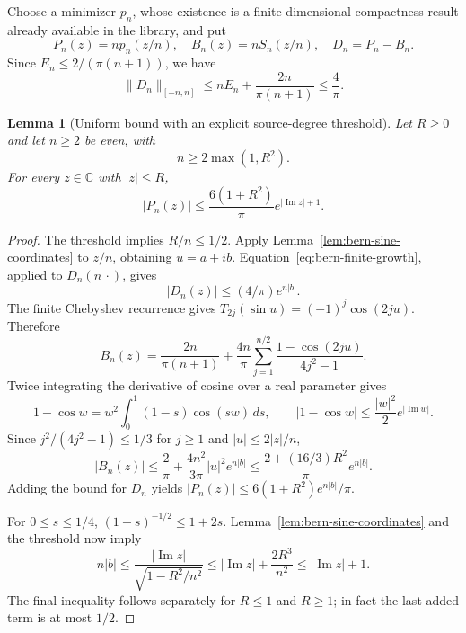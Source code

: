 \documentclass[11pt,a4paper]{article}
\newtheorem{lemma}[theorem]{Lemma}
\theoremstyle{definition}
\newcommand{\C}{\mathbb C}
\begin{document}
Choose a minimizer $p_n$, whose existence is a finite-dimensional
compactness result already available in the library, and put
\[
 P_n(z)=np_n(z/n),\quad B_n(z)=nS_n(z/n),\quad D_n=P_n-B_n.
\]
Since $E_n\le2/(\pi(n+1))$, we have
\begin{equation}
 \|D_n\|_{[-n,n]}\le nE_n+\frac{2n}{\pi(n+1)}
 \le\frac4\pi.
 \label{eq:bern-bounded-difference}
\end{equation}

\begin{lemma}[Uniform bound with an explicit source-degree threshold]
\label{lem:bern-uniform-finite}
Let $R\ge0$ and let $n\ge2$ be even, with
\[
 n\ge2\max(1,R^2).
\]
For every $z\in\C$ with $|z|\le R$,
\begin{equation}
 |P_n(z)|\le\frac{6(1+R^2)}\pi
                   e^{|\operatorname{Im}z|+1}.
 \label{eq:bern-uniform-finite}
\end{equation}
\end{lemma}
\begin{proof}
The threshold implies $R/n\le1/2$. Apply
Lemma~\ref{lem:bern-sine-coordinates} to $z/n$, obtaining $u=a+ib$.
Equation~\eqref{eq:bern-finite-growth}, applied to
$D_n(n\,\cdot)$, gives
\[
 |D_n(z)|\le(4/\pi)e^{n|b|}.
\]
The finite Chebyshev recurrence gives
$T_{2j}(\sin u)=(-1)^j\cos(2ju)$. Therefore
\[
 B_n(z)=\frac{2n}{\pi(n+1)}+
       \frac{4n}{\pi}\sum_{j=1}^{n/2}
       \frac{1-\cos(2ju)}{4j^2-1}.
\]
Twice integrating the derivative of cosine over a real parameter gives
\[
 1-\cos w=w^2\int_0^1(1-s)\cos(sw)\,ds,
 \qquad |1-\cos w|\le\frac{|w|^2}{2}e^{|\operatorname{Im}w|}.
\]
Since $j^2/(4j^2-1)\le1/3$ for $j\ge1$ and $|u|\le2|z|/n$,
\[
 |B_n(z)|\le\frac2\pi+
     \frac{4n^2}{3\pi}|u|^2e^{n|b|}
 \le\frac{2+(16/3)R^2}{\pi}e^{n|b|}.
\]
Adding the bound for $D_n$ yields
$|P_n(z)|\le6(1+R^2)e^{n|b|}/\pi$.

For $0\le s\le1/4$, $(1-s)^{-1/2}\le1+2s$.
Lemma~\ref{lem:bern-sine-coordinates} and the threshold now imply
\[
 n|b|\le\frac{|\operatorname{Im}z|}{\sqrt{1-R^2/n^2}}
 \le |\operatorname{Im}z|+\frac{2R^3}{n^2}
 \le |\operatorname{Im}z|+1.
\]
The final inequality follows separately for $R\le1$ and $R\ge1$;
in fact the last added term is at most $1/2$.
\end{proof}
\end{document}
